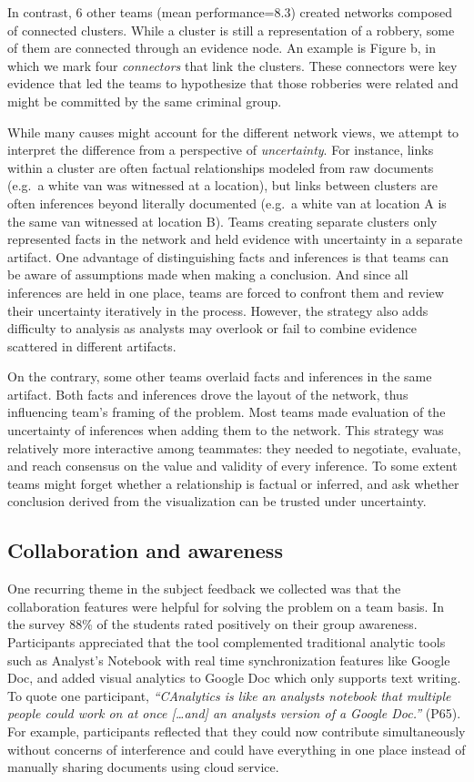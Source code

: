 In contrast, 6 other teams (mean performance=8.3) created networks
composed of connected clusters. While a cluster is still a
representation of a robbery, some of them are connected through an
evidence node. An example is Figure \autocite{fig:network_cluster}b, in
which we mark four \emph{connectors} that link the clusters. These
connectors were key evidence that led the teams to hypothesize that
those robberies were related and might be committed by the same criminal
group.

While many causes might account for the different network views, we
attempt to interpret the difference from a perspective of
\emph{uncertainty}. For instance, links within a cluster are often
factual relationships modeled from raw documents (e.g.~a white van was
witnessed at a location), but links between clusters are often
inferences beyond literally documented (e.g.~a white van at location A
is the same van witnessed at location B). Teams creating separate
clusters only represented facts in the network and held evidence with
uncertainty in a separate artifact. One advantage of distinguishing
facts and inferences is that teams can be aware of assumptions made when
making a conclusion. And since all inferences are held in one place,
teams are forced to confront them and review their uncertainty
iteratively in the process. However, the strategy also adds difficulty
to analysis as analysts may overlook or fail to combine evidence
scattered in different artifacts.

On the contrary, some other teams overlaid facts and inferences in the
same artifact. Both facts and inferences drove the layout of the
network, thus influencing team's framing of the problem. Most teams made
evaluation of the uncertainty of inferences when adding them to the
network. This strategy was relatively more interactive among teammates:
they needed to negotiate, evaluate, and reach consensus on the value and
validity of every inference. To some extent teams might forget whether a
relationship is factual or inferred, and ask whether conclusion derived
from the visualization can be trusted under uncertainty.

\subsection{Collaboration and
awareness}\label{collaboration-and-awareness}

One recurring theme in the subject feedback we collected was that the
collaboration features were helpful for solving the problem on a team
basis. In the survey 88\% of the students rated positively on their
group awareness. Participants appreciated that the tool complemented
traditional analytic tools such as Analyst's Notebook with real time
synchronization features like Google Doc, and added visual analytics to
Google Doc which only supports text writing. To quote one participant,
\emph{``CAnalytics is like an analysts notebook that multiple people
could work on at once {[}\ldots{}and{]} an analysts version of a Google
Doc.''} (P65). For example, participants reflected that they could now
contribute simultaneously without concerns of interference and could
have everything in one place instead of manually sharing documents using
cloud service.

